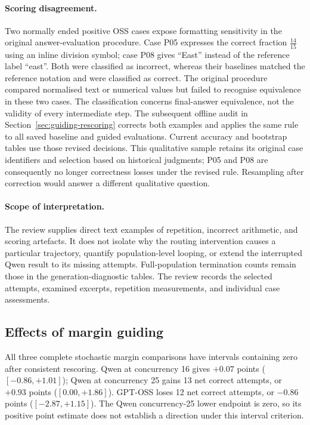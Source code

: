 \documentclass[12pt,a4paper,twoside,openright]{book}
\begin{document}
\paragraph{Scoring disagreement.}
Two normally ended positive OSS cases expose formatting sensitivity in
the original answer-evaluation procedure. Case P05 expresses the correct
fraction $\frac{14}{15}$ using an inline division symbol; case P08 gives
\enquote{East} instead of the reference label \enquote{east}. Both were
classified as incorrect, whereas their baselines matched the reference
notation and were classified as correct. The original procedure compared
normalised text or numerical values but failed to recognise equivalence
in these two cases.
The classification concerns final-answer equivalence, not the validity
of every intermediate step. The subsequent offline audit in
Section~\ref{sec:guiding-rescoring} corrects both examples and applies the
same rule to all saved baseline and guided evaluations. Current accuracy
and bootstrap tables use those revised decisions. This qualitative sample
retains its original case identifiers and selection based on historical judgments;
P05 and P08 are consequently no longer correctness losses under the
revised rule. Resampling after correction would answer a different
qualitative question.

\paragraph{Scope of interpretation.}
The review supplies direct text examples of repetition, incorrect arithmetic,
and scoring artefacts. It does not isolate why the routing intervention
causes a particular trajectory, quantify population-level looping, or
extend the interrupted Qwen result to its missing attempts. Full-population
termination counts remain those in the generation-diagnostic tables.
The review records the selected attempts, examined excerpts, repetition
measurements, and individual case assessments.

\subsection{Effects of margin guiding}

All three complete stochastic margin comparisons have intervals containing
zero after consistent rescoring. Qwen at concurrency 16 gives $+0.07$
points ($[-0.86,+1.01]$); Qwen at concurrency 25 gains 13 net correct
attempts, or $+0.93$ points ($[0.00,+1.86]$). GPT-OSS loses 12 net
correct attempts, or $-0.86$ points ($[-2.87,+1.15]$). The Qwen
concurrency-25 lower endpoint is zero, so its positive point estimate does
not establish a direction under this interval criterion.
\end{document}

